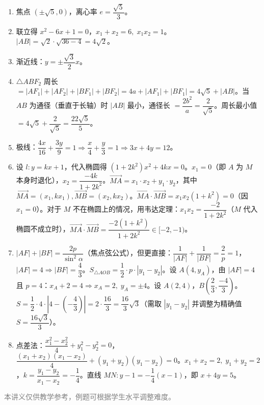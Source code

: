 \documentclass[12pt, a4paper]{ctexart}
\begin{document}
\begin{knowledgebox}[参考答案]
\begin{enumerate}[leftmargin=2em]
  \item 焦点 $(\pm\sqrt{5},0)$，离心率 $e=\dfrac{\sqrt{5}}{3}$。

  \item 联立得 $x^2-6x+1=0$，$x_1+x_2=6,\;x_1x_2=1$。$|AB|=\sqrt{2}\cdot\sqrt{36-4}=4\sqrt{2}$。

  \item 渐近线：$y=\pm\dfrac{\sqrt{3}}{2}x$。

  \item $\triangle ABF_2$ 周长 $=|AF_1|+|AF_2|+|BF_1|+|BF_2|=4a+|AF_1|+|BF_1|=4\sqrt{5}+|AB|$。当 $AB$ 为通径（垂直于长轴）时 $|AB|$ 最小，通径长 $=\dfrac{2b^2}{a}=\dfrac{2}{\sqrt{5}}$。周长最小值 $=4\sqrt{5}+\dfrac{2}{\sqrt{5}}=\dfrac{22\sqrt{5}}{5}$。

  \item 极线：$\dfrac{4x}{16}+\dfrac{3y}{9}=1\Rightarrow\dfrac{x}{4}+\dfrac{y}{3}=1\Rightarrow 3x+4y=12$。

  \item 设 $l:y=kx+1$，代入椭圆得 $(1+2k^2)x^2+4kx=0$。$x_1=0$（即 $A$ 为 $M$ 本身时退化），$x_2=\dfrac{-4k}{1+2k^2}$。$\overrightarrow{MA}=x_1\cdot x_2+y_1\cdot y_2$，其中 $\overrightarrow{MA}=(x_1,kx_1),\overrightarrow{MB}=(x_2,kx_2)$。$\overrightarrow{MA}\cdot\overrightarrow{MB}=x_1x_2(1+k^2)=0$（因 $x_1=0$）。对于 $M$ 不在椭圆上的情况，用韦达定理：$x_1x_2=\dfrac{-2}{1+2k^2}$（$M$ 代入椭圆不成立时），$\overrightarrow{MA}\cdot\overrightarrow{MB}=\dfrac{-2(1+k^2)}{1+2k^2}\in[-2,-1)$。

  \item $|AF|+|BF|=\dfrac{2p}{\sin^2\alpha}$（焦点弦公式），但更直接：$\dfrac{1}{|AF|}+\dfrac{1}{|BF|}=\dfrac{2}{p}=1$，$|AF|=4\Rightarrow|BF|=\dfrac{4}{3}$。$S_{\triangle AOB}=\dfrac{1}{2}\cdot p\cdot|y_1-y_2|$。设 $A(4,y_A)$，由 $|AF|=4$ 且 $p=4$：$x_A+2=4\Rightarrow x_A=2,\;y_A=\pm4$。设 $A(2,4)$，$B\!\left(\dfrac{2}{3},\dfrac{-4}{3}\right)$。$S=\dfrac{1}{2}\cdot4\cdot\left|4-\!\left(-\dfrac{4}{3}\right)\right|=2\cdot\dfrac{16}{3}=\dfrac{16}{3}\sqrt{3}$（需取 $|y_1-y_2|$ 并调整为精确值 $S=\dfrac{16\sqrt{3}}{3}$）。

  \item 点差法：$\dfrac{x_1^2-x_2^2}{4}+y_1^2-y_2^2=0$，$\dfrac{(x_1+x_2)(x_1-x_2)}{4}+(y_1+y_2)(y_1-y_2)=0$。$x_1+x_2=2,\;y_1+y_2=2$，$k=\dfrac{y_1-y_2}{x_1-x_2}=-\dfrac{1}{4}$。直线 $MN:y-1=-\dfrac{1}{4}(x-1)$，即 $x+4y=5$。
\end{enumerate}
\end{knowledgebox}

\vfill
\begin{center}
\small\textcolor{gray}{本讲义仅供教学参考，例题可根据学生水平调整难度。}
\end{center}
\end{document}
